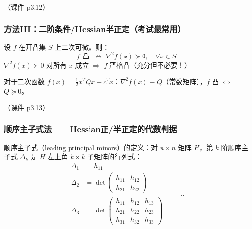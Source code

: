（课件 p3.12）

\subsubsection{方法III：二阶条件/Hessian半正定（考试最常用）}

设 $f$ 在开凸集 $S$ 上二次可微。则：
\[
f \text{ 凸 } \;\Longleftrightarrow\; \nabla^2 f(x) \succeq 0,\quad \forall x\in S
\]
$\nabla^2 f(x) \succ 0$ 对所有 $x$ 成立 $\Longrightarrow$ $f$ 严格凸（充分但不必要！）

对于二次函数 $f(x)=\frac12 x^T Q x + c^T x$：$\nabla^2 f(x) \equiv Q$（常数矩阵），$f$ 凸 $\Longleftrightarrow$ $Q \succeq 0$。

（课件 p3.13）

\subsubsection{顺序主子式法——Hessian正/半正定的代数判据}

顺序主子式（leading principal minors）的定义：对 $n\times n$ 矩阵 $H$，第 $k$ 阶顺序主子式 $\Delta_k$ 是 $H$ 左上角 $k\times k$ 子矩阵的行列式：
\[
\begin{aligned}
\Delta_1 &= h_{11} \\
\Delta_2 &= \det\begin{pmatrix}h_{11}&h_{12}\\h_{21}&h_{22}\end{pmatrix} \\
\Delta_3 &= \det\begin{pmatrix}h_{11}&h_{12}&h_{13}\\h_{21}&h_{22}&h_{23}\\h_{31}&h_{32}&h_{33}\end{pmatrix}
\end{aligned}
\qquad\dots
\]

